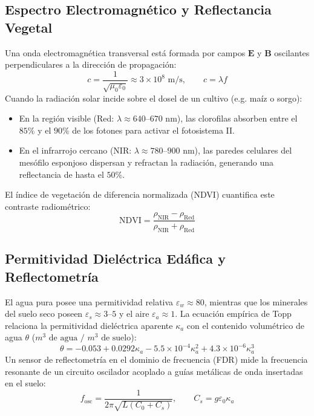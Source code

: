 \documentclass[spanish,letterpaper,oneside]{article}
\begin{document}
\subsection{Espectro Electromagnético y Reflectancia Vegetal}
Una onda electromagnética transversal está formada por campos $\mathbf{E}$ y $\mathbf{B}$ oscilantes perpendiculares a la dirección de propagación:
\begin{equation}
    c = \frac{1}{\sqrt{\mu_0 \varepsilon_0}} \approx 3 \times 10^8\text{ m/s}, \qquad c = \lambda f
\end{equation}
Cuando la radiación solar incide sobre el dosel de un cultivo (e.g. maíz o sorgo):
\begin{itemize}
    \item En la región visible (Red: $\lambda \approx 640\text{--}670\text{ nm}$), las clorofilas absorben entre el $85\%$ y el $90\%$ de los fotones para activar el fotosistema II.
    \item En el infrarrojo cercano (NIR: $\lambda \approx 780\text{--}900\text{ nm}$), las paredes celulares del mesófilo esponjoso dispersan y refractan la radiación, generando una reflectancia de hasta el $50\%$.
\end{itemize}
El índice de vegetación de diferencia normalizada (NDVI) cuantifica este contraste radiométrico:
\begin{equation}
    \mathrm{NDVI} = \frac{\rho_{\mathrm{NIR}} - \rho_{\mathrm{Red}}}{\rho_{\mathrm{NIR}} + \rho_{\mathrm{Red}}}
\end{equation}

\subsection{Permitividad Dieléctrica Edáfica y Reflectometría}
El agua pura posee una permitividad relativa $\varepsilon_w \approx 80$, mientras que los minerales del suelo seco poseen $\varepsilon_s \approx 3\text{--}5$ y el aire $\varepsilon_a \approx 1$.
La ecuación empírica de Topp relaciona la permitividad dieléctrica aparente $\kappa_a$ con el contenido volumétrico de agua $\theta$ ($m^3\text{ de agua / }m^3\text{ de suelo}$):
\begin{equation}
    \theta = -0.053 + 0.0292 \kappa_a - 5.5 \times 10^{-4} \kappa_a^2 + 4.3 \times 10^{-6} \kappa_a^3
\end{equation}
Un sensor de reflectometría en el dominio de frecuencia (FDR) mide la frecuencia resonante de un circuito oscilador acoplado a guías metálicas de onda insertadas en el suelo:
\begin{equation}
    f_{\mathrm{osc}} = \frac{1}{2\pi \sqrt{L (C_0 + C_s)}}, \qquad C_s = g \varepsilon_0 \kappa_a
\end{equation}
\end{document}
